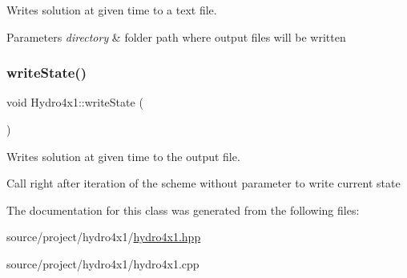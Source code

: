 Writes solution at given time to a text file. 


\begin{DoxyParams}{Parameters}
{\em directory} & folder path where output files will be written \\
\hline
\end{DoxyParams}
\mbox{\label{classHydro4x1_a776a3b1a53cca37f09e7bb883fa004b3}} 
\subsubsection{\texorpdfstring{write\+State()}{writeState()}\hspace{0.1cm}{\footnotesize\ttfamily [2/2]}}
{\footnotesize\ttfamily void Hydro4x1\+::write\+State (\begin{DoxyParamCaption}{ }\end{DoxyParamCaption})}



Writes solution at given time to the output file. 

Call right after iteration of the scheme without parameter to write current state 

The documentation for this class was generated from the following files\+:\begin{DoxyCompactItemize}
\item 
source/project/hydro4x1/\mbox{\hyperlink{hydro4x1_8hpp}{hydro4x1.\+hpp}}\item 
source/project/hydro4x1/hydro4x1.\+cpp\end{DoxyCompactItemize}
